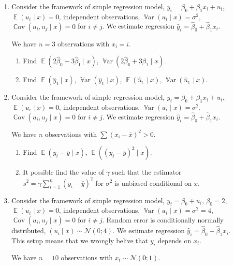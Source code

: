 \documentclass[12pt]{article}
\DeclareMathOperator{\Cov}{\mathbb{C}ov}
\DeclareMathOperator{\Var}{\mathbb{V}ar}
\DeclareMathOperator{\E}{\mathbb{E}}
\newcommand \cN{\mathcal{N}}
\newcommand{\hy}{\hat y}
\newcommand{\hb}{\hat\beta}
\begin{document}
\begin{enumerate}

\item Consider the framework of simple regression model, $y_i = \beta_0 + \beta_1 x_i + u_i$, 
$\E(u_i \mid x) = 0$, independent observations, $\Var(u_i \mid x) = \sigma^2$, $\Cov(u_i, u_j \mid x) = 0$ for $i\neq j$.
We estimate regression $\hat y_i = \hb_0 + \hb_1 x_i$.

We have $n=3$ observations with $x_i = i$.

\begin{enumerate}
    \item Find $\E(2\hb_0 + 3\hb_1 \mid x)$, $\Var(2\hb_0 + 3\hb_1 \mid x)$.
    \item Find $\E(\hy_1 \mid x)$, $\Var(\hy_1 \mid x)$, $\E(\hat u_1 \mid x)$, $\Var(\hat u_1 \mid x)$.
\end{enumerate}

\item Consider the framework of simple regression model, $y_i = \beta_0 + \beta_1 x_i + u_i$, 
$\E(u_i \mid x) = 0$, independent observations, $\Var(u_i \mid x) = \sigma^2$, $\Cov(u_i, u_j \mid x) = 0$ for $i\neq j$.
We estimate regression $\hat y_i = \hb_0 + \hb_1 x_i$.

We have $n$ observations with $\sum (x_i - \bar x)^2 > 0$.

\begin{enumerate}
    \item Find $\E(y_i - \bar y \mid x)$, $\E((y_i - \bar y)^2 \mid x)$.
    \item It possible find the value of $\gamma$ such that the estimator $s^2 = \gamma \sum_{i=1}^n (y_i - \bar y)^2$ for $\sigma^2$ 
    is unbiased conditional on $x$. 
\end{enumerate}


\item Consider the framework of simple regression model, $y_i = \beta_0 + u_i$, $\beta_0 = 2$,
$\E(u_i \mid x) = 0$, independent observations, $\Var(u_i \mid x) = \sigma^2 = 4$, $\Cov(u_i, u_j \mid x) = 0$ for $i\neq j$.
Random error is conditionally normally distributed, $(u_i \mid x) \sim \cN(0; 4)$.
We estimate regression $\hat y_i = \hb_0 + \hb_1 x_i$.
This setup means that we wrongly belive that $y_i$ depends on $x_i$.

We have $n= 10$ observations with $x_i \sim \cN(0; 1)$.


\end{enumerate}
\end{document}

